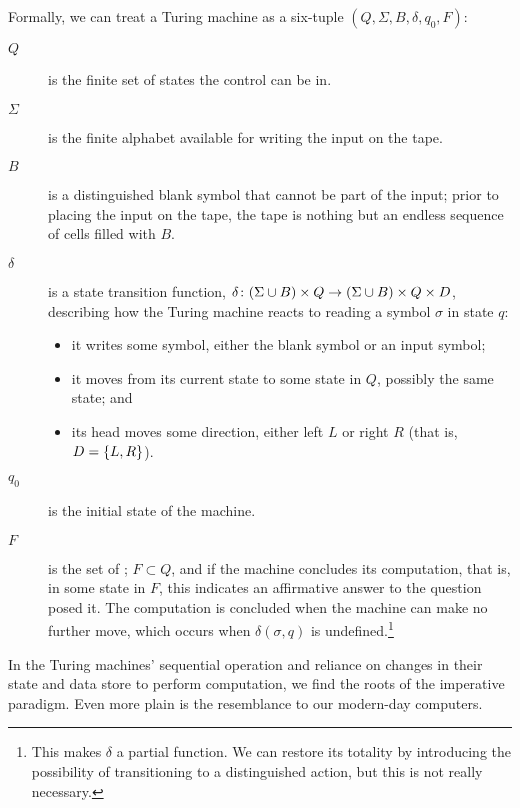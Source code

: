 Formally, we can treat a Turing machine as a six-tuple $(Q, \Sigma, B, \delta, q_{0}, F)$:
\begin{description} %
\item[\MakeUppercase{$Q$}] is the finite set of states the control can be in.
\item[$\Sigma$] is the finite alphabet available for writing the input on the tape.
\item[\MakeUppercase{$B$}] is a distinguished blank symbol that cannot be part of the input; prior to placing the input on the tape, the tape is nothing but an endless sequence of cells filled with $B$.
\item[$\delta$] is a state transition function, $\delta\colon (\Sigma \cup B) \times Q \to (\Sigma \cup B) \times Q \times D$, describing how the Turing machine reacts to reading a symbol $\sigma$ in state $q$:
\begin{itemize}
\item it writes some symbol, either the blank symbol or an input symbol; 
\item it moves from its current state to some state in $Q$, possibly the same state; and
\item its head moves some direction, either left $L$ or right $R$ (that is, $D = \left\{ L, R \right\}$).
\end{itemize}
\item[$q_{0}$] is the initial state of the machine.
\item[\MakeUppercase{$F$}] is the set of ; $F \subset Q$, and if the machine concludes its computation, that is,  in some state in $F$, this indicates an affirmative answer to the question posed it. The computation is concluded when the machine can make no further move, which occurs when $\delta(\sigma, q)$ is undefined.\footnote{This makes $\delta$ a partial function. We can restore its totality by introducing the possibility of transitioning to a distinguished  action, but this is not really necessary.}
\end{description}

In the Turing machines' sequential operation and reliance on changes in their state and data store to perform computation, we find the roots of the imperative paradigm. Even more plain is the resemblance to our modern-day computers. %